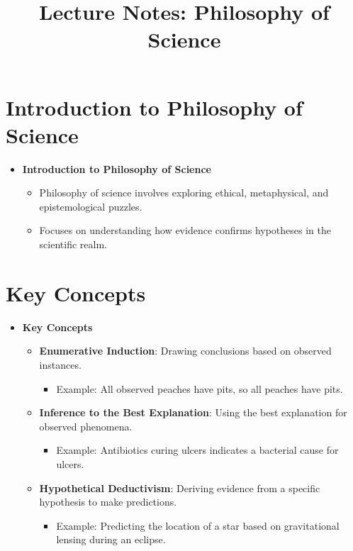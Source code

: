 \documentclass{article}
\begin{document}
\title{Lecture Notes: Philosophy of Science}
\author{}
\date{}
\maketitle

\tableofcontents

\newpage

\section{Introduction to Philosophy of Science}
\begin{itemize}
  \item \textbf{Introduction to Philosophy of Science}
    \begin{itemize}
      \item Philosophy of science involves exploring ethical, metaphysical, and epistemological puzzles.
      \item Focuses on understanding how evidence confirms hypotheses in the scientific realm.
    \end{itemize}
\end{itemize}

\section{Key Concepts}
\begin{itemize}
  \item \textbf{Key Concepts}
    \begin{itemize}
      \item \textbf{Enumerative Induction}: Drawing conclusions based on observed instances.
          \begin{itemize}
            \item Example: All observed peaches have pits, so all peaches have pits.
          \end{itemize}
      \item \textbf{Inference to the Best Explanation}: Using the best explanation for observed phenomena.
          \begin{itemize}
            \item Example: Antibiotics curing ulcers indicates a bacterial cause for ulcers.
          \end{itemize}
      \item \textbf{Hypothetical Deductivism}: Deriving evidence from a specific hypothesis to make predictions.
          \begin{itemize}
            \item Example: Predicting the location of a star based on gravitational lensing during an eclipse.
          \end{itemize}
    \end{itemize}
\end{itemize}
\end{document}
